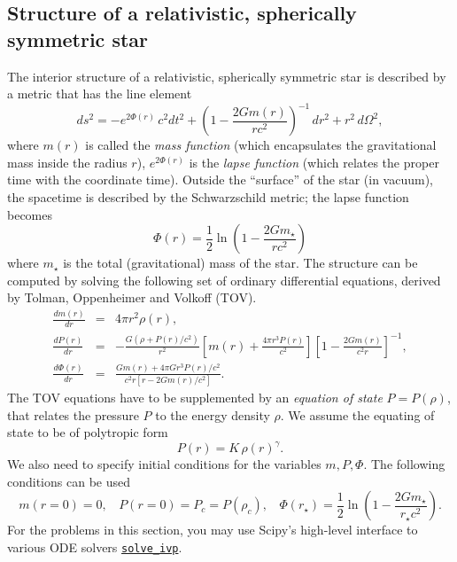 %
\subsection{Structure of a relativistic, spherically symmetric star}
\label{sec:TOV}
%
The interior structure of a relativistic, spherically symmetric star is described by a metric that has the line element 
\begin{equation}
ds^2 = - e^{2\Phi(r)} \, c^2 dt^2 + \left(1 - \frac{2Gm(r)}{rc^2} \right)^{-1} \, dr^2 + r^2 \, d\Omega^2,
\end{equation}
where $m(r)$ is called the \emph{mass function} (which encapsulates the {gravitational mass} inside the radius $r$), $e^{2\Phi(r)}$ is the \emph{lapse function} (which relates the proper time with the coordinate time). Outside the ``surface'' of the star (in vacuum), the spacetime is described by the Schwarzschild metric; the lapse function becomes 
\begin{equation}
\Phi(r) = \frac{1}{2} \ln \left(1 - \frac{2Gm_\star}{rc^2} \right)
\label{eq:lapse_schwarz}
\end{equation}
where $m_\star$ is the total (gravitational) mass of the star. The structure can be computed by solving the following set of ordinary differential equations, derived by Tolman, Oppenheimer and Volkoff (TOV). 
\begin{eqnarray}
\frac{dm(r)}{dr} & = &{4 \pi} r^2 \rho(r), \label{eq:tov1} \\
\frac{dP(r)}{dr} & = & -\frac{G (\rho + P(r)/c^2)}{r^2} \left[m(r) + \frac{4\pi r^3 P(r)}{c^2} \right] \left[1- \frac{2G m(r)}{c^2 r} \right]^{-1}, \label{eq:tov2} \\
\frac{d\Phi(r)}{dr} & = & \frac{G m(r) + 4 \pi G r^3 P(r) / c^2}{c^2 r  [r - 2Gm(r)/c^2]}. \label{eq:tov3}
\end{eqnarray}
The TOV equations have to be supplemented by an \emph{equation of state} $P = P(\rho)$, that relates the pressure $P$ to the energy density $\rho$. We assume the equating of state to be of polytropic form
\begin{equation}
P(r) = K \, \rho(r) ^{\gamma}.
\end{equation}
We also need to specify initial conditions for the variables $m, P, \Phi$. The following conditions can be used 
\begin{equation}
\label{eq:tov_boundary}
m ( r = 0) = 0, ~~~~ P(r = 0) = P_c = P(\rho_c), ~~~~ \Phi(r_\star) = \frac{1}{2} \ln \left(1 - \frac{2Gm_\star}{r_\star c^2} \right).  
\end{equation}
For the problems in this section, you may use Scipy's high-level interface to various ODE solvers \href{https://docs.scipy.org/doc/scipy/reference/generated/scipy.integrate.solve_ivp.html}{\texttt{solve\_ivp}}. 

